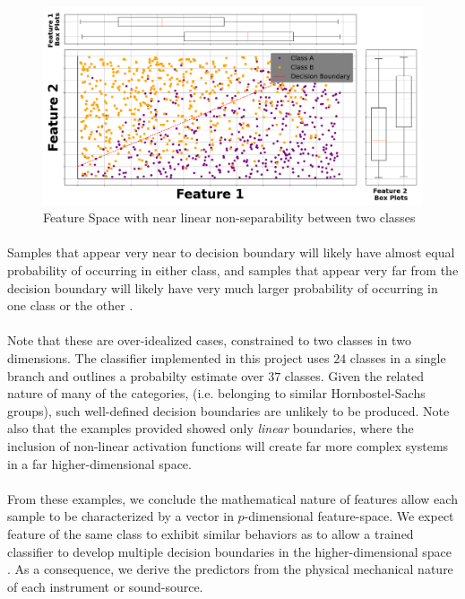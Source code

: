 \documentclass[12pt,letterpaper]{article}
\begin{document}
\begin{figure}[H]
\begin{center}
\includegraphics[scale=0.35]{../MakeFigures/LinearNonSeparable}
\end{center}
\caption{Feature Space with near linear non-separability between two classes}
\label{fig-LinNonSep}
\end{figure}

\paragraph*{}Samples that appear very near to decision boundary will likely have almost equal probability of occurring in either class, and samples that appear very far from the decision boundary will likely have very much larger probability of occurring in one class or the other \cite{Bishop,James}. 

\paragraph*{}Note that these are over-idealized cases, constrained to two classes in two dimensions. The classifier implemented in this project uses $24$ classes in a single branch and outlines a probabilty estimate over $37$ classes. Given the related nature of many of the categories, (i.e. belonging to similar Hornbostel-Sachs groups), such well-defined decision boundaries are unlikely to be produced. Note also that the examples provided showed only \textit{linear} boundaries, where the inclusion of non-linear activation functions will create far more complex systems in a far higher-dimensional space.

\paragraph*{}From these examples, we conclude the mathematical nature of features allow each sample to be characterized by a vector in $p$-dimensional feature-space\cite{Goodfellow}. We expect feature of the same class to exhibit similar behaviors as to allow a trained classifier to develop multiple decision boundaries in the higher-dimensional space \cite{James,Bishop}. As a consequence, we derive the predictors from the physical mechanical nature of each instrument or sound-source.
\end{document}
